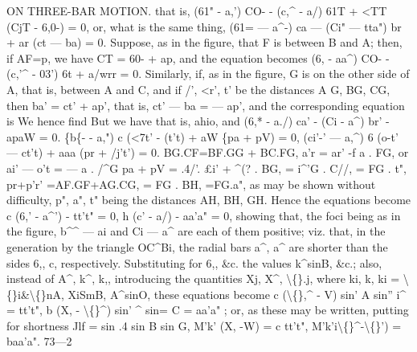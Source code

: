 \documentclass[12pt,a4paper]{article}
\begin{document}
ON THREE-BAR MOTION.
that
is,
(61" - a,') CO- - (c,\textasciicircum{} - a/) 61T + <TT (CjT - 6,0-) = 0,
or, what
is the same
thing,
(61= --- a\textasciicircum{}-) ca --- (Ci" --- tta") br + ar (ct --- ba) = 0.
Suppose,
as
in
the
figure,
that F
is
between B
and A;
then,
if AF=p, we
have CT = 60- + ap, and the equation becomes
(6,\guillemotleft{} - aa\textasciicircum{}) CO- - (c,'\textasciicircum{} - 03') 6t + a/wrr = 0.
Similarly,
if,
as
in
the
figure, G
is
on
the
other
side
of
A,
that
is,
between A
and
C,
and
if
/\guillemotright{}',
<r',
t'
be
the
distances A G, BG,
CG,
then
ba' = ct' + ap',
that
is,
ct' --- ba = --- ap', and
the corresponding equation
is
We hence
find
But we have
that
is,
ahio,
and
(6,* - a./) ca' - (Ci\guillemotright{} - a\textasciicircum{}) br' - apaW = 0.
\{b\{- - a,") c (<7t' - (t't) + aW \{pa + pV) = 0,
(ci'-' --- a,\textasciicircum{}) 6 (o-t' --- ct't) + aaa (pr + /j't') = 0.
BG.CF=BF.GG + BC.FG,
a'r = ar'
-f a
. FG,
or
ai' --- o't = --- a
. /\textasciicircum{}G
pa + pV = .4/'. \pounds{}i' + \textasciicircum{}(?
. BG, = i\textasciicircum{}'G
. C//, = FG
. t",
pr+p'r' =AF.GF+AG.CG, = FG
. BH, =FG.a",
as
may
be
shown
without
difficulty,
p",
a",
t"
being
the
distances AH, BH,
GH.
Hence the equations become
c (6,' - a\textasciicircum{}') - tt't" = 0,
h (c' - a/) - aa'a" = 0,
showing
that,
the
foci
being
as
in
the
figure,
b\textasciicircum{}\textasciicircum{} --- ai
and
Ci\textdegree{} --- a\textasciicircum{}
are
each
of them
positive;
viz.
that,
in
the
generation
by the
triangle
OC\textasciicircum{}Bi, the
radial
bars
a\textasciicircum{},
a\textasciicircum{} are
shorter than the
sides
6,,
c,
respectively.
Substituting
for
6,, \&c. the values k\textasciicircum{}sinB, \&c.;
also, instead of A\textasciicircum{},
k\textasciicircum{},
k,, introducing the quantities
Xj,
X\textasciicircum{},
\textbackslash\{\}.j, where
ki,
k\guillemotleft{},
ki = \textbackslash\{\}i\&\textbackslash\{\}nA, XiSmB, A\textasciicircum{}sinO,
these equations become
c (\textbackslash\{\},\textasciicircum{} - V) sin' A sin'' i\textasciicircum{} = tt't",
b (X,\guillemotright{} - \textbackslash\{\}\textasciicircum{}) sin' \textasciicircum{} sin= C = aa'a"
;
or, as these may be
written, putting
for shortness
Jlf = sin .4 sin B sin G,
M'k' (X,\guillemotright{} -W) = c tt't",
M'k'i\textbackslash\{\}\textasciicircum{}-\textbackslash\{\}') = baa'a".
73---2
\end{document}
